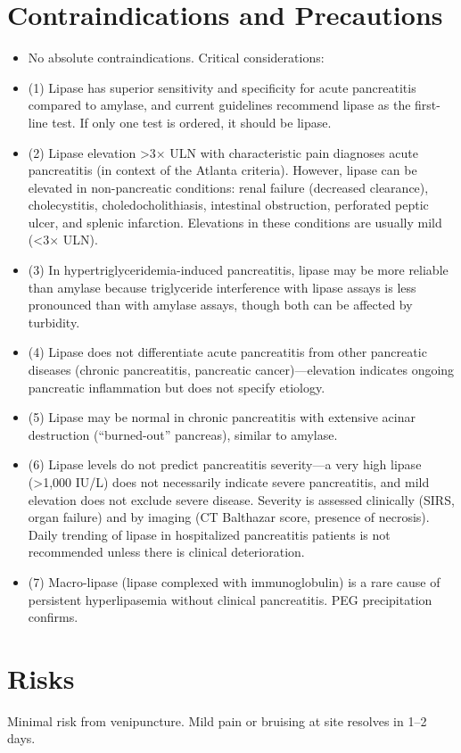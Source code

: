 \section*{Contraindications and Precautions}
\begin{itemize}
  \item No absolute contraindications. Critical considerations:
  \item (1) Lipase has superior sensitivity and specificity for acute pancreatitis compared to amylase, and current guidelines recommend lipase as the first-line test. If only one test is ordered, it should be lipase.
  \item (2) Lipase elevation >3$\times$ ULN with characteristic pain diagnoses acute pancreatitis (in context of the Atlanta criteria). However, lipase can be elevated in non-pancreatic conditions: renal failure (decreased clearance), cholecystitis, choledocholithiasis, intestinal obstruction, perforated peptic ulcer, and splenic infarction. Elevations in these conditions are usually mild (<3$\times$ ULN).
  \item (3) In hypertriglyceridemia-induced pancreatitis, lipase may be more reliable than amylase because triglyceride interference with lipase assays is less pronounced than with amylase assays, though both can be affected by turbidity.
  \item (4) Lipase does not differentiate acute pancreatitis from other pancreatic diseases (chronic pancreatitis, pancreatic cancer)---elevation indicates ongoing pancreatic inflammation but does not specify etiology.
  \item (5) Lipase may be normal in chronic pancreatitis with extensive acinar destruction (``burned-out'' pancreas), similar to amylase.
  \item (6) Lipase levels do not predict pancreatitis severity---a very high lipase (>1,000 IU/L) does not necessarily indicate severe pancreatitis, and mild elevation does not exclude severe disease. Severity is assessed clinically (SIRS, organ failure) and by imaging (CT Balthazar score, presence of necrosis). Daily trending of lipase in hospitalized pancreatitis patients is not recommended unless there is clinical deterioration.
  \item (7) Macro-lipase (lipase complexed with immunoglobulin) is a rare cause of persistent hyperlipasemia without clinical pancreatitis. PEG precipitation confirms.
\end{itemize}
\section*{Risks}
Minimal risk from venipuncture. Mild pain or bruising at site resolves in 1--2 days.

